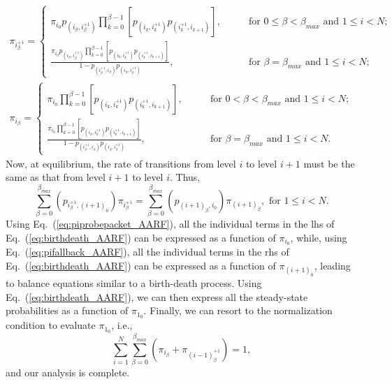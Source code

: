 \documentclass[11pt, journal, letterpaper, oneside, onecolumn]{IEEEtran}
\begin{document}
\begin{eqnarray}\label{eq:piprobepacket_AARF}
\pi_{i^{+1}_{\beta}}=\left\{\begin{array}{ll}
\pi_{i_{0}}p_{(i_{\beta},i^{+1}_{\beta})}\prod_{k=0}^{\beta-1}{[p_{(i_{k},i_{k}^{+1})}p_{(i^{+1}_{k},{i}_{k+1})}]},
& \qquad \mbox{for $0\leq\beta<\beta_{max}$ and $1\leq i<N$};\\[0.15in]
\frac{\pi_{i_{0}}p_{(i_{\beta},i^{+1}_{\beta})}\prod_{k=0}^{\beta-1}{[p_{(i_{k},i_{k}^{+1})}p_{(i^{+1}_{k},{i}_{k+1})}]}}{1-p_{(i^{+1}_{\beta},{i}_{\beta})}p_{(i_{\beta},{i}^{+1}_{\beta})}},
& \qquad \mbox{for $\beta=\beta_{max}$ and $1\leq i<N$};
\end{array}
\right.
\end{eqnarray}
\begin{eqnarray}\label{eq:pifallback_AARF}
\pi_{i_{\beta}}=\left\{\begin{array}{ll}
\pi_{i_{0}}\prod_{k=0}^{\beta-1}{[p_{(i_{k},i_{k}^{+1})}p_{(i^{+1}_{k},{i}_{k+1})}]},
& \qquad \mbox{for $0<\beta<\beta_{max}$ and $1\leq i<N$};\\[0.15in]
\frac{\pi_{i_{0}}\prod_{k=0}^{\beta-1}{[p_{(i_{k},i_{k}^{+1})}p_{(i^{+1}_{k},{i}_{k+1})}]}}{1-p_{(i^{+1}_{\beta},{i}_{\beta})}p_{(i_{\beta},{i}^{+1}_{\beta})}},
& \qquad \mbox{for $\beta=\beta_{max}$ and $1\leq i<N$}.
\end{array}
\right.
\end{eqnarray}
Now, at equilibrium, the rate of transitions from level $i$ to
level $i+1$ must be the same as that from level $i+1$ to level
$i$. Thus,
\begin{equation}
\sum_{\beta=0}^{\beta_{max}}
(p_{i^{+1}_{\beta},{{(i+1)}_{0}}})\pi_{i^{+1}_{\beta}}=\sum_{\beta=0}^{\beta_{max}}(p_{{(i+1)}_{\beta},{i_{0}}})\pi_{{(i+1)}_{\beta}},
\mbox{ for $1\leq i<N$}.\label{eq:birthdeath_AARF}
\end{equation}
Using Eq.~(\ref{eq:piprobepacket_AARF}), all the individual terms in
the lhs of Eq.~(\ref{eq:birthdeath_AARF}) can be expressed as a
function of $\pi_{i_{0}}$, while, using
Eq.~(\ref{eq:pifallback_AARF}), all the individual terms in the rhs
of Eq.~(\ref{eq:birthdeath_AARF}) can be expressed as a function of
$\pi_{(i+1)_{0}}$, leading to balance equations similar to a
birth-death process. Using Eq.~(\ref{eq:birthdeath_AARF}), we can
then express all the steady-state probabilities as a function of
$\pi_{1_{0}}$.
Finally, we can resort to the normalization condition  to evaluate
$\pi_{1_{0}}$, i.e.,
\begin{equation}\label{eq:nc_AARF}
\sum_{i=1}^{N}{\sum_{\beta=0}^{\beta_{max}}{(\pi_{i_{\beta}}+\pi_{(i-1)^{+1}_{\beta}})}}=1,
\end{equation}
and our analysis is complete.
\end{document}
